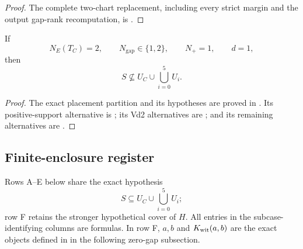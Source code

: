 \begin{proof}
The complete two-chart replacement, including every strict margin and the
output gap-rank recomputation, is
.
\end{proof}

\begin{proposition}
\label{prop:new-one-vd-assembly}
If
\[
 N_E(T_C)=2,
 \qquad N_{\mathrm{gap}}\in\{1,2\},
 \qquad N_+=1,
 \qquad d=1,
\]
then
\[
 S\nsubseteq U_C\cup\bigcup_{i=0}^5U_i.
\]
\end{proposition}

\begin{proof}
The exact placement partition and its hypotheses are proved in
.  Its positive-support alternative is
; its Vd2 alternatives are
; and its remaining alternatives are
.
\end{proof}

\subsection{Finite-enclosure register}

Rows A--E below share the exact hypothesis
\[
 S\subseteq U_C\cup\bigcup_{i=0}^5U_i;
\]
row F retains the stronger hypothetical cover of $H$.  All entries in the
subcase-identifying columns are formulas.
In row F, $a,b$ and $K_{\rm wit}(a,b)$ are the exact objects defined in
 in the following
zero-gap subsection.

